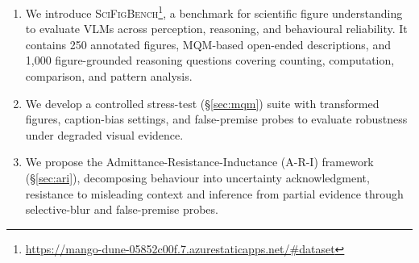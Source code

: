 \begin{enumerate}[label=(\roman*)]
    \item We introduce \textsc{SciFigBench}\footnote{\url{https://mango-dune-05852c00f.7.azurestaticapps.net/\#dataset}}, a benchmark for scientific figure understanding to evaluate VLMs across perception, reasoning, and behavioural reliability. It contains 250 annotated figures, MQM-based open-ended descriptions, and 1,000 figure-grounded reasoning questions covering counting, computation, comparison, and pattern analysis.

    \item We develop a controlled stress-test 
    (\S\ref{sec:mqm})
    suite with transformed figures, caption-bias settings, and false-premise probes to evaluate robustness under degraded visual evidence.

    \item We propose the Admittance-Resistance-Inductance (A-R-I) framework (\S\ref{sec:ari}), decomposing behaviour into uncertainty acknowledgment, resistance to misleading context and inference from partial evidence through selective-blur and false-premise probes.
\end{enumerate}
